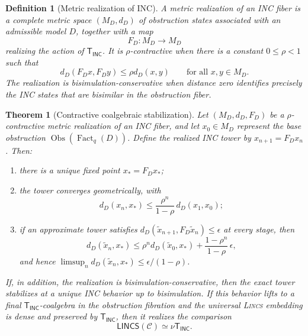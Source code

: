 \documentclass{article}
\newtheorem{definition}{Definition}
\newtheorem{theorem}{Theorem}
\newcommand{\C}{\mathcal{C}}
\newcommand{\T}{\mathsf{T}}
\newcommand{\LINCS}{\mathsf{LINCS}}
\newcommand{\INC}{\mathsf{INC}}
\newcommand{\Fact}{\operatorname{Fact}}
\newcommand{\Obs}{\operatorname{Obs}}
\begin{document}
\begin{definition}[Metric realization of INC]
A metric realization of an INC fiber is a complete metric space
\((M_D,d_D)\) of obstruction states associated with an admissible model \(D\),
together with a map
\[
F_D:M_D\to M_D
\]
realizing the action of \(\T_{\INC}\).  It is \(\rho\)-contractive when there
is a constant \(0\leq \rho<1\) such that
\[
d_D(F_Dx,F_Dy)\leq \rho d_D(x,y)
\qquad\text{for all }x,y\in M_D.
\]
The realization is \emph{bisimulation-conservative} when distance zero
identifies precisely the INC states that are bisimilar in the obstruction
fiber.
\end{definition}

\begin{theorem}[Contractive coalgebraic stabilization]
Let \((M_D,d_D,F_D)\) be a \(\rho\)-contractive metric realization of an INC
fiber, and let \(x_0\in M_D\) represent the base obstruction
\(\Obs(\Fact_q(D))\).  Define the realized INC tower by
\(x_{n+1}=F_Dx_n\).  Then:
\begin{enumerate}[leftmargin=2em]
  \item there is a unique fixed point \(x_\ast=F_Dx_\ast\);
  \item the tower converges geometrically, with
  \[
  d_D(x_n,x_\ast)
    \leq
    \frac{\rho^n}{1-\rho}\,d_D(x_1,x_0);
  \]
  \item if an approximate tower satisfies
  \(d_D(\widetilde x_{n+1},F_D\widetilde x_n)\leq\epsilon\) at every stage,
  then
  \[
  d_D(\widetilde x_n,x_\ast)
    \leq
    \rho^n d_D(\widetilde x_0,x_\ast)
    +\frac{1-\rho^n}{1-\rho}\,\epsilon,
  \]
  and hence
  \(\limsup_n d_D(\widetilde x_n,x_\ast)\leq\epsilon/(1-\rho)\).
\end{enumerate}
If, in addition, the realization is bisimulation-conservative, then the exact
tower stabilizes at a unique INC behavior up to bisimulation.  If this behavior
lifts to a final \(\T_{\INC}\)-coalgebra in the obstruction fibration and the
universal \textsc{Lincs}   embedding is dense and preserved by \(\T_{\INC}\), then it
realizes the comparison
\[
\LINCS(\C)\simeq\nu\T_{\INC}.
\]
\end{theorem}
\end{document}
